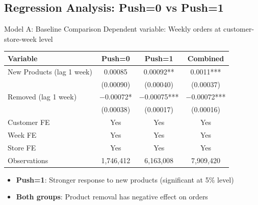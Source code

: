 \documentclass[aspectratio=169]{beamer}  %
\begin{document}
\subsection{Regression Analysis: Push=0 vs Push=1}
\begin{frame}{Model A: Baseline Comparison}
Dependent variable: Weekly orders at customer-store-week level
\vspace{0.2cm}

\begin{table}
\centering
\footnotesize
\begin{tabular}{lccc}
\toprule
\textbf{Variable} & \textbf{Push=0} & \textbf{Push=1} & \textbf{Combined} \\
\midrule
New Products (lag 1 week) & 0.00085 & 0.00092** & 0.0011*** \\
 & (0.00090) & (0.00040) & (0.00037) \\
Removed (lag 1 week) & $-$0.00072* & $-$0.00075*** & $-$0.00072*** \\
 & (0.00038) & (0.00017) & (0.00016) \\
\midrule
Customer FE & Yes & Yes & Yes \\
Week FE & Yes & Yes & Yes \\
Store FE & Yes & Yes & Yes \\
\midrule
Observations & 1,746,412 & 6,163,008 & 7,909,420 \\
\bottomrule
\end{tabular}
\end{table}

\begin{itemize}
    \item \textbf{Push=1}: Stronger response to new products (significant at 5\% level)
    \item \textbf{Both groups}: Product removal has negative effect on orders
\end{itemize}
\end{frame}
\end{document}
